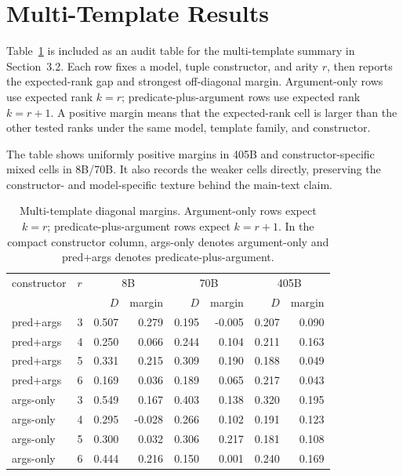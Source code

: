 \documentclass[11pt]{article}
\begin{document}
\section{Multi-Template Results}

Table~\ref{tab:multitemplate} is included as an audit table for the multi-template summary in Section~3.2. Each row fixes a model, tuple constructor, and arity $r$, then reports the expected-rank gap and strongest off-diagonal margin. Argument-only rows use expected rank $k=r$; predicate-plus-argument rows use expected rank $k=r+1$. A positive margin means that the expected-rank cell is larger than the other tested ranks under the same model, template family, and constructor.

The table shows uniformly positive margins in 405B and constructor-specific mixed cells in 8B/70B. It also records the weaker cells directly, preserving the constructor- and model-specific texture behind the main-text claim.

\begin{table}[H]
\centering
\footnotesize
\setlength{\tabcolsep}{5pt}
\begin{tabular}{llrrrrrr}
\toprule
constructor & $r$ & \multicolumn{2}{c}{8B} & \multicolumn{2}{c}{70B} & \multicolumn{2}{c}{405B} \\
 & & $D$ & margin & $D$ & margin & $D$ & margin \\
\midrule
pred+args & 3 & 0.507 & 0.279 & 0.195 & -0.005 & 0.207 & 0.090 \\
pred+args & 4 & 0.250 & 0.066 & 0.244 & 0.104 & 0.211 & 0.163 \\
pred+args & 5 & 0.331 & 0.215 & 0.309 & 0.190 & 0.188 & 0.049 \\
pred+args & 6 & 0.169 & 0.036 & 0.189 & 0.065 & 0.217 & 0.043 \\
args-only & 3 & 0.549 & 0.167 & 0.403 & 0.138 & 0.320 & 0.195 \\
args-only & 4 & 0.295 & -0.028 & 0.266 & 0.102 & 0.191 & 0.123 \\
args-only & 5 & 0.300 & 0.032 & 0.306 & 0.217 & 0.181 & 0.108 \\
args-only & 6 & 0.444 & 0.216 & 0.150 & 0.001 & 0.240 & 0.169 \\
\bottomrule
\end{tabular}
\caption{Multi-template diagonal margins. Argument-only rows expect $k=r$; predicate-plus-argument rows expect $k=r+1$. In the compact constructor column, args-only denotes argument-only and pred+args denotes predicate-plus-argument.}
\label{tab:multitemplate}
\end{table}
\end{document}
